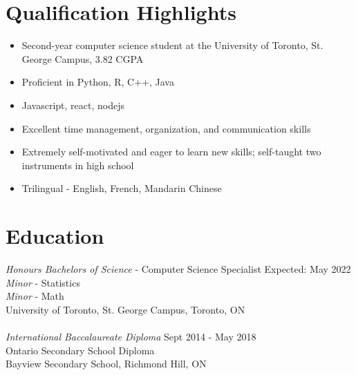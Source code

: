 \documentclass[letter]{res}
\begin{document}
\address{ (647)-968-0036 \\}
\address{
    \texttt{zenghao.wang@mail.utoronto.ca}\\
    \texttt{github.com/ZenghaoWang}
}
\begin{resume}
    \noindent\makebox[\linewidth]{\rule{\paperwidth}{0.4pt}}

    \section{Qualification Highlights}
    \begin{itemize}
        \item Second-year computer science student at the University of Toronto, St. George Campus, 3.82 CGPA
        \item Proficient in Python, R, C++, Java
        \item Javascript, react, nodejs
        \item Excellent time management, organization, and communication skills
        \item Extremely self-motivated and eager to learn new skills; self-taught two instruments in high school
        \item Trilingual - English, French, Mandarin Chinese
    \end{itemize}
    \section{Education}
     {\sl Honours Bachelors of Science} - Computer Science Specialist \hfill Expected: May 2022\\
    {\sl Minor} - Statistics \\
    {\sl Minor} - Math \\
    University of Toronto, St. George Campus,  Toronto, ON \\
    \\
    {\sl International Baccalaureate Diploma}  \hfill Sept 2014 - May 2018\\
    Ontario Secondary School Diploma \\
    Bayview Secondary School,  Richmond Hill, ON
    \vspace{-2mm}


\end{resume}
\end{document}

